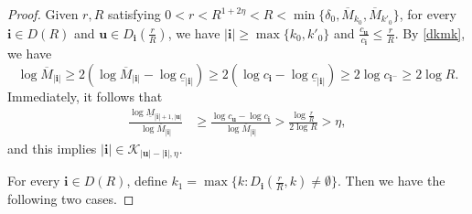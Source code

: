 \documentclass[10pt,a4paper]{amsart}
\newcommand{\bu}{\mathbf{u}}
\newcommand{\de}{\delta}
\newcommand{\f}{\frac}
\newcommand{\iii}{\mathbf{i}}
\newcommand{\kk}{\mathcal{K}}
\newcommand{\om}{\overline{M}}
\newcommand{\uc}{\underline{c}}
\newcommand{\um}{\underline{M}}
\renewcommand{\geq}{\geqslant}
\renewcommand{\ge}{\geqslant}
\renewcommand{\leq}{\leqslant}
\begin{document}
\begin{proof}
		
		Given $r,R$ satisfying $0<r<R^{1+2\eta}<R<\min \{ \de_0,\om_{k_0},\om_{k'_0}\}$,  for every $\iii\in D(R)$  and $\bu\in D_\iii\left(\f rR\right)$, we have $|\iii|\ge \max\{k_0,k'_0\}$ and $\frac{c_\bu}{c_\iii}\leq \frac{r}{R}$. By \eqref{dkmk}, we have
		$$
		\log \om_{|\iii|}\geq 2(\log \om_{|\iii|}-\log\uc_{|\iii|})\geq 2(\log c_{\iii}-\log\uc_{|\iii|}) \geq 2\log c_{\iii^-} \geq 2\log R.
		$$
		Immediately, it follows that 
		\begin{align*}
			\f{\log \um_{|\iii|+1,|\bu|}}{\log \om_{|\iii|}}
			&\ge \f{\log{c_\bu}-\log{c_\iii}}{\log \om_{|\iii|}} >\f{\log\f{r}R}{2\log R} >\eta, 
		\end{align*}
		and this implies  $|\iii|\in \kk_{|\bu|-|\iii|,\eta}$.
		
		
		For every $\iii\in D(R)$, define $k_1=\max\big\{k:D_\iii(\f rR,k)\neq\emptyset\big\} $. Then we have the following two cases.
		

\end{proof}
\end{document}
